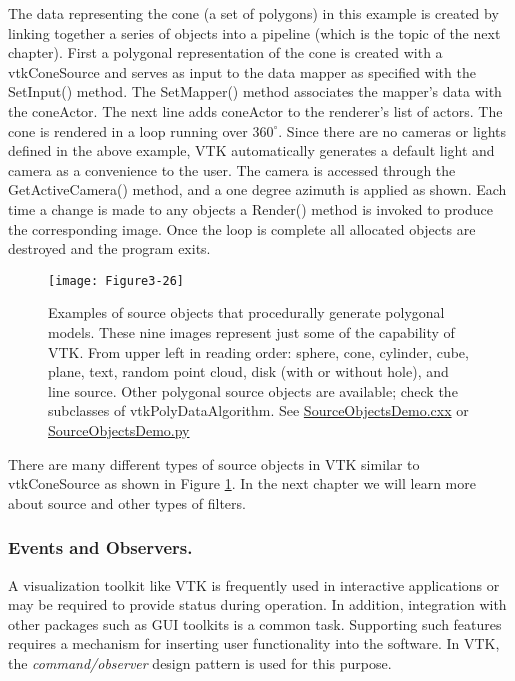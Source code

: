 The data representing the cone (a set of polygons) in this example is created by linking together a series of objects into a pipeline (which is the topic of the next chapter). First a polygonal representation of the cone is created with a vtkConeSource and serves as input to the data mapper as specified with the SetInput() method. The SetMapper() method associates the mapper's data with the coneActor. The next line adds coneActor to the renderer's list of actors. The cone is rendered in a loop running over $360^\circ$. Since there are no cameras or lights defined in the above example, VTK automatically generates a default light and camera as a convenience to the user. The camera is accessed through the GetActiveCamera() method, and a one degree azimuth is applied as shown. Each time a change is made to any objects a Render() method is invoked to produce the corresponding image. Once the loop is complete all allocated objects are destroyed and the program exits.

\begin{figure}[!htb]
  \centering
  \texttt{[image: Figure3-26]}\\
  \caption{Examples of source objects that procedurally generate polygonal models. These nine images represent just some of the capability of VTK. From upper left in reading order: sphere, cone, cylinder, cube, plane, text, random point cloud, disk (with or without hole), and line source. Other polygonal source objects are available; check the subclasses of vtkPolyDataAlgorithm. See  \href{https://lorensen.github.io/VTKExamples/site/Cxx/GeometricObjects/SourceObjectsDemo/}{SourceObjectsDemo.cxx} or \href{https://lorensen.github.io/VTKExamples/site/Python/GeometricObjects/SourceObjectsDemo/}{SourceObjectsDemo.py}}\label{fig:Figure3-26}
\end{figure}

There are many different types of source objects in VTK similar to vtkConeSource as shown in Figure \ref{fig:Figure3-26}. In the next chapter we will learn more about source and other types of filters.

\subsubsection{Events and Observers.}
\label{sub:events_obdervers}
A visualization toolkit like VTK is frequently used in interactive applications or may be required to provide status during operation. In addition, integration with other packages such as GUI toolkits is a common task. Supporting such features requires a mechanism for inserting user functionality into the software. In VTK, the \emph{command/observer} design pattern \cite{Gamma95} is used for this purpose.

